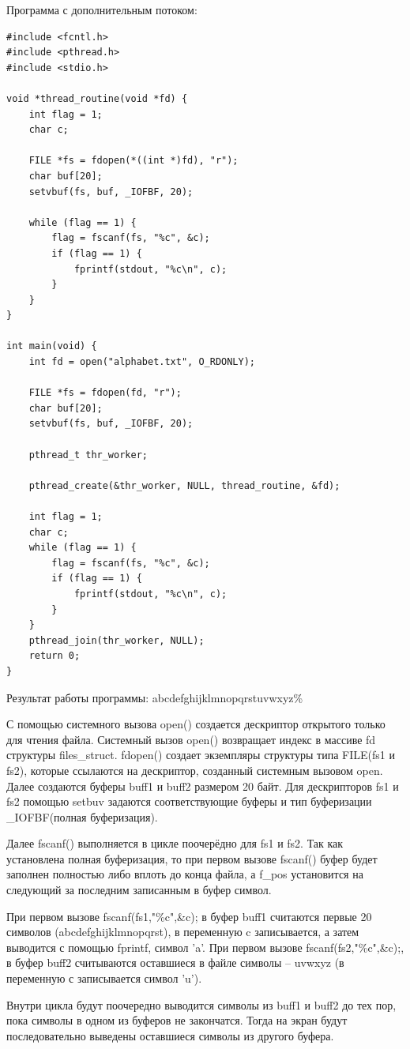 Программа с дополнительным потоком:\newpage
\begin{lstlisting}
#include <fcntl.h>
#include <pthread.h>
#include <stdio.h>

void *thread_routine(void *fd) {
	int flag = 1;
	char c;
	
	FILE *fs = fdopen(*((int *)fd), "r");
	char buf[20];
	setvbuf(fs, buf, _IOFBF, 20);
	
	while (flag == 1) {
		flag = fscanf(fs, "%c", &c);
		if (flag == 1) {
			fprintf(stdout, "%c\n", c);
		}
	}
}

int main(void) {
	int fd = open("alphabet.txt", O_RDONLY);
	
	FILE *fs = fdopen(fd, "r");
	char buf[20];
	setvbuf(fs, buf, _IOFBF, 20);
	
	pthread_t thr_worker;
	
	pthread_create(&thr_worker, NULL, thread_routine, &fd);
	
	int flag = 1;
	char c;
	while (flag == 1) {
		flag = fscanf(fs, "%c", &c);
		if (flag == 1) {
			fprintf(stdout, "%c\n", c);
		}
	}
	pthread_join(thr_worker, NULL);
	return 0;
}
\end{lstlisting}

Результат работы программы:
abcdefghijklmnopqrstuvwxyz\%

\newpage
С помощью системного вызова open() создается дескриптор открытого только для
чтения файла. Системный вызов open() возвращает индекс в массиве fd структуры
files\_struct. fdopen() создает экземпляры структуры типа FILE(fs1 и fs2),
которые ссылаются на дескриптор, созданный системным вызовом open.
Далее создаются буферы	buff1 и buff2 размером 20 байт. Для дескрипторов fs1 и
fs2 помощью setbuv задаются соответствующие буферы и тип буферизации
\_IOFBF(полная буферизация).

Далее fscanf() выполняется в цикле поочерёдно для fs1 и  fs2. Так как
установлена полная буферизация, то при первом вызове fscanf() буфер будет
заполнен полностью либо вплоть до конца файла, а f\_pos установится на
следующий за последним записанным в буфер символ.

При первом вызове fscanf(fs1,"\%c",\&c); в буфер buff1 считаются первые 20
символов (abcdefghijklmnopqrst), в переменную c записывается, а затем выводится
с помощью fprintf, символ 'a'. При первом вызове fscanf(fs2,"\%c",\&c);, в
буфер buff2 считываются оставшиеся в файле символы – uvwxyz (в переменную с
записывается символ 'u').

Внутри цикла будут поочередно выводится символы из buff1 и buff2 до тех пор,
пока символы в одном из буферов не закончатся. Тогда на экран будут
последовательно выведены оставшиеся символы из другого буфера.

